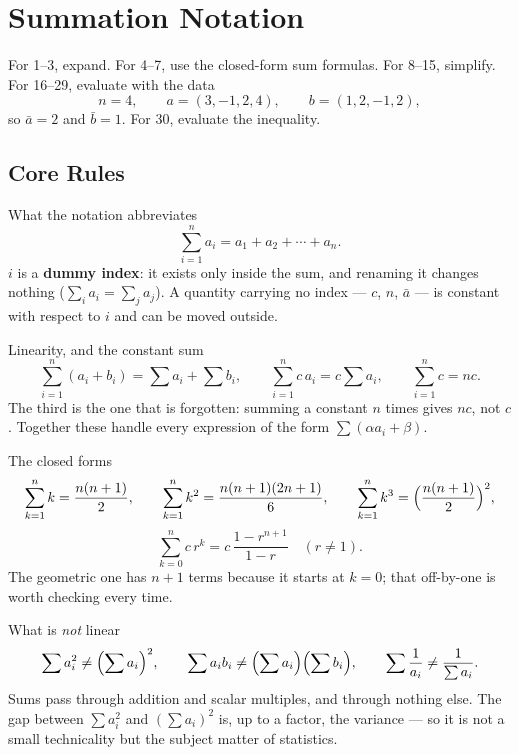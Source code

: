 \chapter{Summation Notation}

For 1--3, expand. For 4--7, use the closed-form sum formulas. For 8--15,
simplify. For 16--29, evaluate with the data
\[
  n=4,\qquad a=(3,-1,2,4),\qquad b=(1,2,-1,2),
\]
so $\bar a=2$ and $\bar b=1$. For 30, evaluate the inequality.

\section{Core Rules}

\begin{rulebox}{What the notation abbreviates}
\[
  \sum_{i=1}^{n}a_{i}=a_{1}+a_{2}+\cdots+a_{n} .
\]
$i$ is a \textbf{dummy index}: it exists only inside the sum, and renaming
it changes nothing ($\sum_{i}a_{i}=\sum_{j}a_{j}$). A quantity carrying no
index --- $c$, $n$, $\bar a$ --- is constant with respect to $i$ and can be
moved outside.
\end{rulebox}

\begin{rulebox}{Linearity, and the constant sum}
\[
  \sum_{i=1}^{n}(a_{i}+b_{i})=\sum a_{i}+\sum b_{i},\qquad
  \sum_{i=1}^{n}c\,a_{i}=c\sum a_{i},\qquad
  \sum_{i=1}^{n}c=nc .
\]
The third is the one that is forgotten: summing a constant $n$ times gives
$nc$, not $c$. Together these handle every expression of the form
$\sum(\alpha a_{i}+\beta)$.
\end{rulebox}

\begin{rulebox}{The closed forms}
\[
  \sum_{k=1}^{n}k=\frac{n(n+1)}{2},\qquad
  \sum_{k=1}^{n}k^{2}=\frac{n(n+1)(2n+1)}{6},\qquad
  \sum_{k=1}^{n}k^{3}=\Bigl(\frac{n(n+1)}{2}\Bigr)^{2},
\]
\[
  \sum_{k=0}^{n}c\,r^{k}=c\,\frac{1-r^{n+1}}{1-r}\quad(r\neq1) .
\]
The geometric one has $n+1$ terms because it starts at $k=0$; that
off-by-one is worth checking every time.
\end{rulebox}

\begin{rulebox}{What is \emph{not} linear}
\[
  \sum a_{i}^{2}\neq\Bigl(\sum a_{i}\Bigr)^{2},\qquad
  \sum a_{i}b_{i}\neq\Bigl(\sum a_{i}\Bigr)\Bigl(\sum b_{i}\Bigr),\qquad
  \sum\frac{1}{a_{i}}\neq\frac{1}{\sum a_{i}} .
\]
Sums pass through addition and scalar multiples, and through nothing else.
The gap between $\sum a_{i}^{2}$ and $(\sum a_{i})^{2}$ is, up to a factor,
the variance --- so it is not a small technicality but the subject matter of
statistics.
\end{rulebox}

